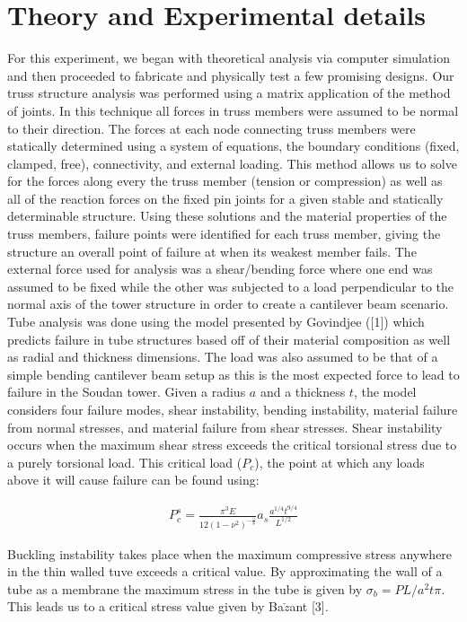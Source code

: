 \documentclass[final]{svjour2}
\begin{document}
\section{Theory and Experimental details}
For this experiment, we began with theoretical analysis via computer simulation and then proceeded to fabricate and physically test a few promising designs.  Our truss structure analysis was performed using a matrix application of the method of joints.  In this technique all forces in truss members were assumed to be normal to their direction.  The forces at each node connecting truss members were statically determined using a system of equations, the boundary conditions (fixed, clamped, free), connectivity, and external loading.  This method allows us to solve for the forces along every the truss member (tension or compression) as well as all of the reaction forces on the fixed pin joints for a given stable and statically determinable structure.  Using these solutions and the material properties of the truss members, failure points were identified for each truss member, giving the structure an overall point of failure at when its weakest member fails.  The external force used for analysis was a shear/bending force where one end was assumed to be fixed while the other was subjected to a load perpendicular to the normal axis of the tower structure in order to create a cantilever beam scenario.  
Tube analysis was done using the model presented by Govindjee ([1]) which predicts failure in tube structures based off of their material composition as well as radial and thickness dimensions. The load was also assumed to be that of a simple bending cantilever beam setup as this is the most expected force to lead to failure in the Soudan tower.  Given a radius $a$ and a thickness $t$, the model considers four failure modes, shear instability, bending instability, material failure from normal stresses, and material failure from shear stresses.  Shear instability occurs when the maximum shear stress exceeds the critical torsional stress due to a purely torsional load.  This critical load ($P_{c}$), the point at which any loads above it will cause failure can be found using:

\begin{eqnarray}
P_{c}^{s} = \frac{\pi^3E}{12(1-\nu^2)^{-\frac{5}{8}}}a_{s}\frac{a^{1/4}t^{9/4}}{L^{1/2}}
\end{eqnarray}

Buckling instability takes place when the maximum compressive stress anywhere in the thin walled tuve exceeds a critical value.  By approximating the wall of a tube as a membrane the maximum stress in the tube is given by $\sigma_{b} = PL/a^2t\pi$. This leads us to a critical stress value given by Ba$\check{z}$ant [3].
\end{document}
